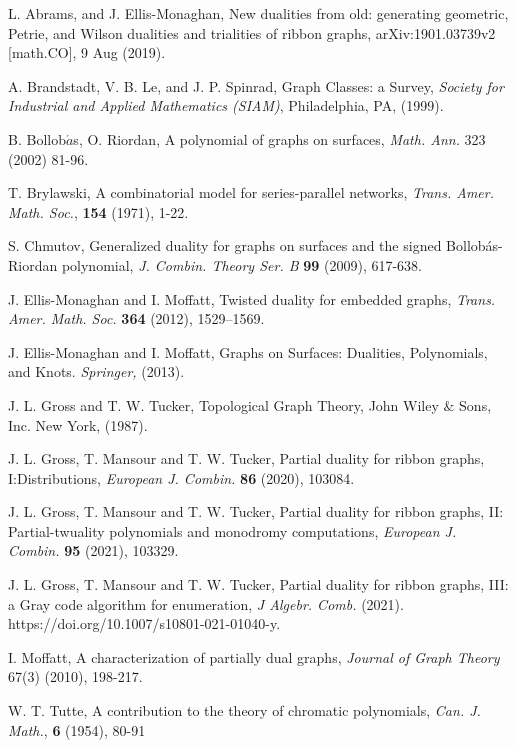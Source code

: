 \begin{thebibliography}{99}


 L. Abrams, and J. Ellis-Monaghan, New dualities from old: generating geometric, Petrie, and Wilson
dualities and trialities of ribbon graphs, arXiv:1901.03739v2 [math.CO], 9 Aug (2019).

A. Brandstadt, V. B. Le, and J. P. Spinrad, Graph Classes: a Survey, \emph{Society for
Industrial and Applied Mathematics (SIAM)}, Philadelphia, PA, (1999).


B. Bollob$\acute{a}$s, O. Riordan, A polynomial of graphs on surfaces, \emph{Math. Ann.} 323 (2002) 81-96.

  T. Brylawski, A combinatorial model for series-parallel networks,
 \emph{Trans. Amer. Math. Soc.}, \textbf{154}  (1971), 1-22.



 S. Chmutov, Generalized duality for graphs on surfaces and the signed Bollob\'as-Riordan polynomial, \emph{J. Combin. Theory Ser. B } \textbf{99} (2009), 617-638.

J. Ellis-Monaghan and I. Moffatt,
Twisted duality for embedded graphs,
\textsl{Trans. Amer. Math. Soc.} \textbf{364} (2012), 1529--1569.

 J. Ellis-Monaghan and I. Moffatt, Graphs on Surfaces: Dualities, Polynomials, and Knots. \emph{Springer,} (2013).

 J. L. Gross and T. W. Tucker, Topological Graph Theory, John Wiley $\&$
Sons, Inc. New York, (1987).

 J. L. Gross, T. Mansour and T. W. Tucker,
Partial duality for ribbon graphs, I:Distributions,
\emph{European J. Combin.} \textbf{86} (2020),  103084.

 J. L. Gross, T. Mansour and T. W. Tucker,
Partial duality for ribbon graphs, II: Partial-twuality polynomials and monodromy computations,
\textsl{European J. Combin.} \textbf{95} (2021), 103329.


 J. L. Gross, T. Mansour and T. W. Tucker,
Partial duality for ribbon graphs, III: a Gray code algorithm for enumeration,
\textsl{J Algebr. Comb.} (2021). https://doi.org/10.1007/s10801-021-01040-y.

I. Moffatt, A characterization of partially dual graphs, \emph{Journal of Graph Theory } 67(3) (2010), 198-217.

W. T. Tutte,  A contribution to the theory of chromatic polynomials,
\emph{ Can. J. Math.}, \textbf{6} (1954), 80-91


\end{thebibliography}










